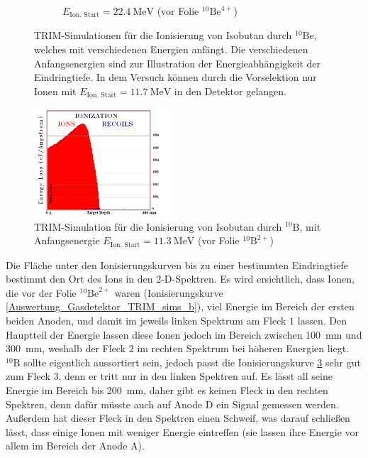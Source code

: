 \begin{figure}[h]
\begin{subfigure}{0.45\textwidth}
        \caption{$E_{\text{Ion, Start}} = \SI{22.4}{\mega\electronvolt}$ (vor Folie $^{10}\text{Be}^{4+}$)}
        \label{Auswertung_Gasdetektor_TRIM_sims_d}
    \end{subfigure}
    \caption{TRIM-Simulationen für die Ionisierung von Isobutan durch $^{10}\text{Be}$, welches mit verschiedenen Energien anfängt. Die verschiedenen Anfangsenergien sind zur Illustration der Energieabhängigkeit der Eindringtiefe. In dem Versuch können durch die Vorselektion nur Ionen mit $E_{\text{Ion, Start}} = \SI{11.7}{\mega\electronvolt}$ in den Detektor gelangen.}
    \label{Auswertung_Gasdetektor_TRIM_sims}
\end{figure}
\begin{figure}[h]
	\centering
    \includegraphics[width=0.45\textwidth]{Pictures/TRIM_Ionisierung_10Bor_in_Isobutan_vorher_2+.png}
	\caption{TRIM-Simulation für die Ionisierung von Isobutan durch $^{10}\text{B}$, mit Anfangsenergie $E_{\text{Ion, Start}} = \SI{11.3}{\mega\electronvolt}$ (vor Folie $^{10}\text{B}^{2+}$)}
	\label{Auswertung_Gasdetektor_TRIM_sim_Bor}
\end{figure}
Die Fläche unter den Ionisierungskurven bis zu einer bestimmten Eindringtiefe bestimmt den Ort des Ions in den 2-D-Spektren.
Es wird ersichtlich, dass Ionen, die vor der Folie $^{10}\text{Be}^{2+}$ waren (Ionisierungskurve \ref{Auswertung_Gasdetektor_TRIM_sims_b}), viel Energie im Bereich der ersten beiden Anoden, und damit im jeweils linken Spektrum am Fleck $1$ lassen.
Den Hauptteil der Energie lassen diese Ionen jedoch im Bereich zwischen \SI{100}{\milli\metre} und \SI{300}{\milli\metre}, weshalb der Fleck $2$ im rechten Spektrum bei höheren Energien liegt.
$^{10}\text{B}$ sollte eigentlich aussortiert sein, jedoch passt die Ionisierungskurve \ref{Auswertung_Gasdetektor_TRIM_sim_Bor} sehr gut zum Fleck $3$, denn er tritt nur in den linken Spektren auf.
Es lässt all seine Energie im Bereich bis \SI{200}{\milli\metre}, daher gibt es keinen Fleck in den rechten Spektren, denn dafür müsste auch auf Anode D ein Signal gemessen werden.
Außerdem hat dieser Fleck in den Spektren einen \glqq Schweif\grqq{}, was darauf schließen lässt, dass einige Ionen mit weniger Energie eintreffen (sie lassen ihre Energie vor allem im Bereich der Anode A).
